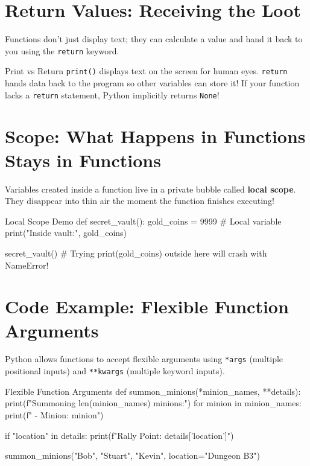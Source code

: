 \section{Return Values: Receiving the Loot}

Functions don't just display text; they can calculate a value and hand it back to you using the \texttt{return} keyword.


\begin{viperpitfall}{Print vs Return}
\texttt{print()} displays text on the screen for human eyes.
\texttt{return} hands data back to the program so other variables can store it!
If your function lacks a \texttt{return} statement, Python implicitly returns \texttt{None}!
\end{viperpitfall}

\section{Scope: What Happens in Functions Stays in Functions}

Variables created inside a function live in a private bubble called \textbf{local scope}. They disappear into thin air the moment the function finishes executing!

\begin{pycode}{Local Scope Demo}
def secret_vault():
    gold_coins = 9999  # Local variable
    print("Inside vault:", gold_coins)

secret_vault()
# Trying print(gold_coins) outside here will crash with NameError!
\end{pycode}

\section{Code Example: Flexible Function Arguments}

Python allows functions to accept flexible arguments using \texttt{*args} (multiple positional inputs) and \texttt{**kwargs} (multiple keyword inputs).

\begin{pycode}{Flexible Function Arguments}
def summon_minions(*minion_names, **details):
    print(f"Summoning {len(minion_names)} minions:")
    for minion in minion_names:
        print(f" - Minion: {minion}")
    
    if "location" in details:
        print(f"Rally Point: {details['location']}")

summon_minions("Bob", "Stuart", "Kevin", location="Dungeon B3")
\end{pycode}

